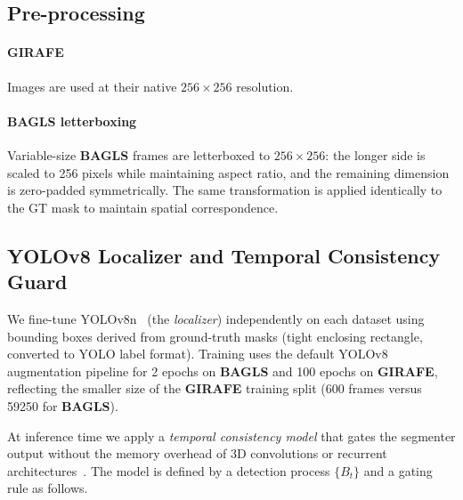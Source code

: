 \documentclass[preprint,12pt]{elsarticle}
\newcommand{\girafe}{\textbf{GIRAFE}}
\newcommand{\bagls}{\textbf{BAGLS}}
\begin{document}
\subsection{Pre-processing}
\label{sec:preproc}

\paragraph{\girafe{}}
Images are used at their native \(256\times256\) resolution.

\paragraph{\bagls{} letterboxing}
Variable-size \bagls{} frames are letterboxed to \(256\times256\):
the longer side is scaled to \num{256} pixels while maintaining aspect ratio,
and the remaining dimension is zero-padded symmetrically.
The same transformation is applied identically to the GT mask to maintain
spatial correspondence.

\subsection{YOLOv8 Localizer and Temporal Consistency Guard}
\label{sec:yolo}

We fine-tune YOLOv8n~\cite{jocher2023yolo} (the \emph{localizer}) independently on each dataset
using bounding boxes derived from ground-truth masks (tight enclosing rectangle,
converted to YOLO label format).
Training uses the default YOLOv8 augmentation pipeline for \num{2} epochs on
\bagls{} and \num{100} epochs on \girafe{}, reflecting the smaller size of
the \girafe{} training split (\num{600} frames versus \num{59250} for \bagls{}).

At inference time we apply a \emph{temporal consistency model} that gates
the segmenter output without the memory overhead of 3D convolutions or
recurrent architectures~\cite{fehling2020convlstm}.
The model is defined by a detection process $\{B_t\}$ and a gating rule as
follows.
\end{document}
